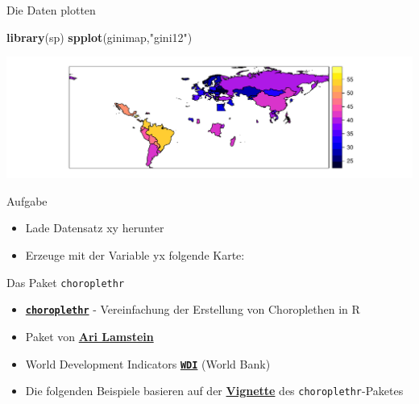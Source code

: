 \documentclass[ignorenonframetext,]{beamer}
\newenvironment{Shaded}{\begin{snugshade}}{\end{snugshade}}
\newcommand{\KeywordTok}[1]{\textcolor[rgb]{0.13,0.29,0.53}{\textbf{#1}}}
\newcommand{\NormalTok}[1]{#1}
\newcommand{\StringTok}[1]{\textcolor[rgb]{0.31,0.60,0.02}{#1}}
\providecommand{\tightlist}{%
  \setlength{\itemsep}{0pt}\setlength{\parskip}{0pt}}
\begin{document}
\begin{frame}[fragile]{Die Daten plotten}
\protect\hypertarget{die-daten-plotten}{}

\begin{Shaded}
\begin{Highlighting}[]
\KeywordTok{library}\NormalTok{(sp)}
\KeywordTok{spplot}\NormalTok{(ginimap,}\StringTok{"gini12"}\NormalTok{)}
\end{Highlighting}
\end{Shaded}

\includegraphics{Choroplethen_files/figure-beamer/unnamed-chunk-12-1.pdf}

\end{frame}

\begin{frame}{Aufgabe}
\protect\hypertarget{aufgabe}{}

\begin{itemize}
\tightlist
\item
  Lade Datensatz xy herunter
\item
  Erzeuge mit der Variable yx folgende Karte:
\end{itemize}

\end{frame}

\begin{frame}[fragile]{Das Paket \texttt{choroplethr}}
\protect\hypertarget{das-paket-choroplethr}{}

\begin{itemize}
\item
  \href{https://cran.r-project.org/web/packages/choroplethr/index.html}{\textbf{\texttt{choroplethr}}}
  - Vereinfachung der Erstellung von Choroplethen in R
\item
  Paket von \href{http://www.arilamstein.com/}{\textbf{Ari Lamstein}}
\item
  World Development Indicators
  \href{https://cran.r-project.org/web/packages/WDI/index.html}{\textbf{\texttt{WDI}}}
  (World Bank)
\item
  Die folgenden Beispiele basieren auf der
  \href{https://cran.r-project.org/web/packages/choroplethr/index.html}{\textbf{Vignette}}
  des \texttt{choroplethr}-Paketes
\end{itemize}

\end{frame}
\end{document}
